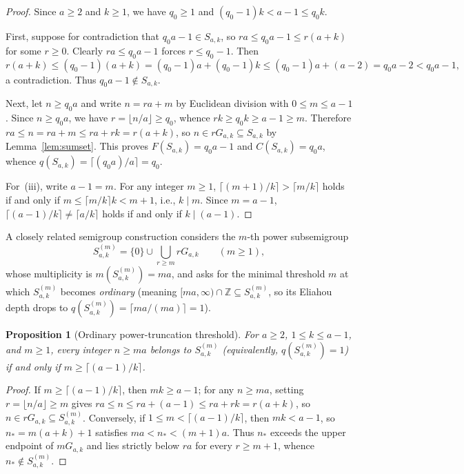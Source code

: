\documentclass[11pt]{amsart}
\newtheorem{proposition}[theorem]{Proposition}
\theoremstyle{definition}
\theoremstyle{remark}
\newcommand{\ZZ}{\mathbb{Z}}
\begin{document}
\begin{proof}
Since $a \ge 2$ and $k \ge 1$, we have $q_0 \ge 1$ and $(q_0 - 1)k < a - 1 \le q_0 k$.

First, suppose for contradiction that $q_0 a - 1 \in S_{a,k}$, so $ra \le q_0 a - 1 \le r(a+k)$ for some $r \ge 0$. Clearly $ra \le q_0 a - 1$ forces $r \le q_0 - 1$. Then
\[
  r(a+k) \le (q_0 - 1)(a+k) = (q_0 - 1)a + (q_0 - 1)k \le (q_0 - 1)a + (a - 2) = q_0 a - 2 < q_0 a - 1,
\]
a contradiction. Thus $q_0 a - 1 \notin S_{a,k}$.

Next, let $n \ge q_0 a$ and write $n = ra + m$ by Euclidean division with $0 \le m \le a - 1$. Since $n \ge q_0 a$, we have $r = \lfloor n/a \rfloor \ge q_0$, whence $rk \ge q_0 k \ge a - 1 \ge m$. Therefore $ra \le n = ra + m \le ra + rk = r(a+k)$, so $n \in r G_{a,k} \subseteq S_{a,k}$ by Lemma~\ref{lem:sumset}. This proves $F(S_{a,k}) = q_0 a - 1$ and $C(S_{a,k}) = q_0 a$, whence $q(S_{a,k}) = \lceil (q_0 a)/a \rceil = q_0$.

For~(iii), write $a - 1 = m$. For any integer $m \ge 1$, $\lceil (m+1)/k \rceil > \lceil m/k \rceil$ holds if and only if $m \le \lceil m/k \rceil k < m + 1$, i.e., $k \mid m$. Since $m = a - 1$, $\lceil (a-1)/k \rceil \ne \lceil a/k \rceil$ holds if and only if $k \mid (a - 1)$.
\end{proof}

A closely related semigroup construction considers the $m$-th power subsemigroup
\[
  S_{a,k}^{(m)} = \{0\} \cup \bigcup_{r \ge m} r G_{a,k} \qquad (m \ge 1),
\]
whose multiplicity is $m(S_{a,k}^{(m)}) = ma$, and asks for the minimal threshold $m$ at which $S_{a,k}^{(m)}$ becomes \emph{ordinary} (meaning $[ma, \infty) \cap \ZZ \subseteq S_{a,k}^{(m)}$, so its Eliahou depth drops to $q(S_{a,k}^{(m)}) = \lceil ma/(ma) \rceil = 1$).

\begin{proposition}[Ordinary power-truncation threshold]
\label{prop:power-semigroup}
For $a \ge 2$, $1 \le k \le a-1$, and $m \ge 1$, every integer $n \ge ma$ belongs to $S_{a,k}^{(m)}$ (equivalently, $q(S_{a,k}^{(m)}) = 1$) if and only if $m \ge \lceil (a-1)/k \rceil$.
\end{proposition}

\begin{proof}
If $m \ge \lceil (a-1)/k \rceil$, then $mk \ge a - 1$; for any $n \ge ma$, setting $r = \lfloor n/a \rfloor \ge m$ gives $ra \le n \le ra + (a-1) \le ra + rk = r(a+k)$, so $n \in r G_{a,k} \subseteq S_{a,k}^{(m)}$. Conversely, if $1 \le m < \lceil (a-1)/k \rceil$, then $mk < a - 1$, so $n_* = m(a+k) + 1$ satisfies $ma < n_* < (m+1)a$. Thus $n_*$ exceeds the upper endpoint of $m G_{a,k}$ and lies strictly below $r a$ for every $r \ge m + 1$, whence $n_* \notin S_{a,k}^{(m)}$.
\end{proof}
\end{document}
